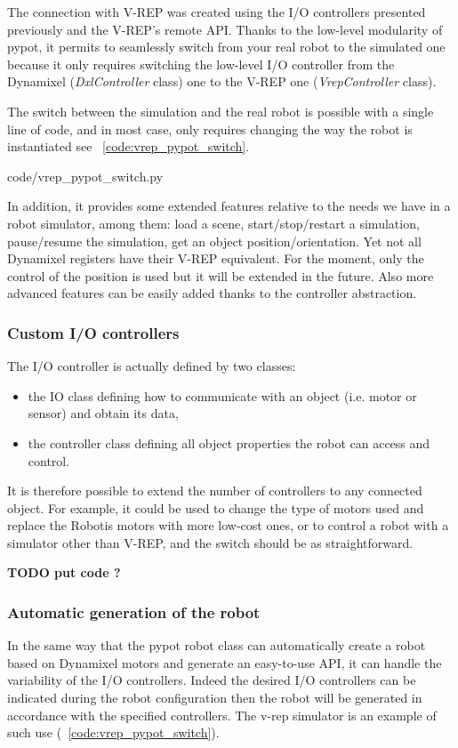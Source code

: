 The connection with V-REP was created using the I/O controllers presented previously and the V-REP’s remote API.
Thanks to the low-level modularity of pypot, it permits to seamlessly switch from your real robot to the simulated one because it only requires switching the low-level I/O controller from the Dynamixel (\emph{DxlController} class) one to the V-REP one (\emph{VrepController} class).

The switch between the simulation and the real robot is possible with a single line of code, and in most case, only requires changing the way the robot is instantiated see \codename~\ref{code:vrep_pypot_switch}.


    {code/vrep_pypot_switch.py}

In addition, it provides some extended features relative to the needs we have in a robot simulator, among them:
load a scene, start/stop/restart a simulation, pause/resume the simulation, get an object position/orientation.
Yet not all Dynamixel registers have their V-REP equivalent. For the moment, only the control of the position is used but it will be extended in the future. Also more advanced features can be easily added thanks to the controller abstraction.


\subsubsection{Custom I/O controllers} %

The I/O controller is actually defined by two classes:

\begin{itemize}
    \item the IO class defining how to communicate with an object (i.e. motor or sensor) and obtain its data,
    \item the controller class defining all object properties the robot can access and control.
\end{itemize}

It is therefore possible to extend the number of controllers to any connected object. For example, it could be used to change the type of motors used and replace the Robotis motors with more low-cost ones, or to control a robot with a simulator other than V-REP, and the switch should be as straightforward.


\textbf{TODO put code ?}


\subsubsection{Automatic generation of the robot} %
In the same way that the pypot robot class can automatically create a robot based on Dynamixel motors and generate an easy-to-use API, it can handle the variability of the I/O controllers. Indeed the desired I/O controllers can be indicated during the robot configuration then the robot will be generated in accordance with the specified controllers. The v-rep simulator is an example of such use (\codename~\ref{code:vrep_pypot_switch}).

